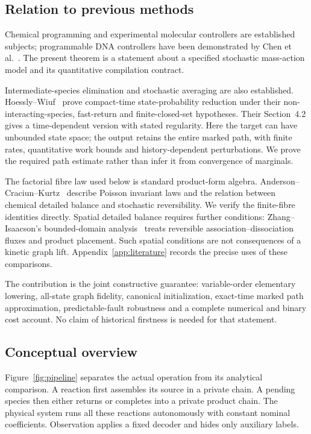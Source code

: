 \documentclass[11pt,reqno]{amsart}
\theoremstyle{definition}
\theoremstyle{remark}
\begin{document}
\subsection{Relation to previous methods}
Chemical programming and experimental molecular controllers are established
subjects; programmable DNA controllers have been demonstrated by Chen et
al.~\cite{Chen2013}. The present theorem is a statement about a specified
stochastic mass-action model and its quantitative compilation contract.

Intermediate-species elimination and stochastic averaging are also established.
Hoessly--Wiuf~\cite[Assumption~2 and Theorem~4.1]{HW2021} prove compact-time
state-probability reduction under their non-interacting-species, fast-return and
finite-closed-set hypotheses. Their Section~4.2 gives a time-dependent version
with stated regularity. Here the target can have unbounded state space; the
output retains the entire marked path, with finite rates, quantitative work
bounds and history-dependent perturbations. We prove the required path estimate
rather than infer it from convergence of marginals.

The factorial fibre law used below is standard product-form algebra.
Anderson--Craciun--Kurtz~\cite[Theorem~4.1 and Section~4.2]{ACK2010} describe
Poisson invariant laws and the relation between chemical detailed balance and
stochastic reversibility. We verify the finite-fibre identities directly.
Spatial detailed balance requires further conditions: Zhang--Isaacson's
bounded-domain analysis~\cite[Section~III, Theorem~III.1]{ZI2022} treats reversible
association--dissociation fluxes and product placement. Such spatial conditions
are not consequences of a kinetic graph lift. Appendix~\ref{app:literature}
records the precise uses of these comparisons.

The contribution is the joint constructive guarantee: variable-order elementary
lowering, all-state graph fidelity, canonical initialization, exact-time marked
path approximation, predictable-fault robustness and a complete numerical and
binary cost account. No claim of historical firstness is needed for that
statement.

\subsection{Conceptual overview}
Figure~\ref{fig:pipeline} separates the actual operation from its analytical
comparison. A reaction first assembles its source in a private chain. A pending
species then either returns or completes into a private product chain. The
physical system runs all these reactions autonomously with constant nominal
coefficients. Observation applies a fixed decoder and hides only auxiliary
labels.
\end{document}
